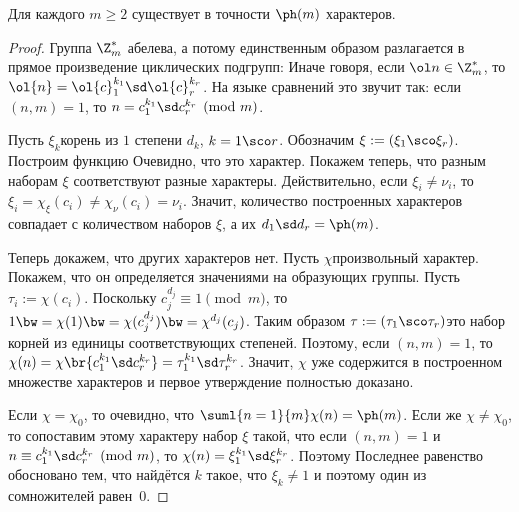 \documentclass[a4paper]{article}
\def\nequiv{\not\equiv}
\begin{document}
\begin{theorem}
Для каждого $m\ge 2$ существует в точности $\ph(m)$ характеров.
\eqn{\sums{\chi}\chi(n)=\case{\ph(m), & n\equiv1\pmod{m},\\0, & n\nequiv1\pmod{m}.}}
\end{theorem}
\begin{proof}
Группа $\Z_m^*$ абелева, а потому единственным образом разлагается в прямое произведение циклических подгрупп:
Иначе говоря, если $\ol n\in \Z_m^*$, то $\ol{n}=\ol{c}_1^{k_1}\sd\ol{c}_r^{k_r}$.
На языке сравнений это звучит так: если $(n,m)=1$, то $n=c_1^{k_1}\sd c_r^{k_r}\pmod{m}$.

Пусть $\xi_k$\т корень из $1$ степени $d_k$, $k=1\sco r$. Обозначим $\xi:=(\xi_1\sco \xi_r)$.
Построим функцию
Очевидно, что это характер.
Покажем теперь, что разным наборам $\xi$ соответствуют разные характеры. Действительно, если
$\xi_i\neq \nu_i$, то $\xi_i=\chi_\xi(c_i)\neq \chi_\nu(c_i)=\nu_i$.
Значит, количество построенных характеров совпадает с количеством наборов $\xi$, а их $d_1\sd d_r=\ph(m)$.

Теперь докажем, что других характеров нет.
Пусть $\chi$\т произвольный характер. Покажем, что он определяется значениями на образующих группы.
Пусть $\tau_i := \chi(c_i)$. Поскольку $c_j^{d_j}\equiv1\pmod{m}$, то $1\bw=\chi(1)\bw=\chi(c_j^{d_j})\bw=\chi^{d_j}(c_j)$.
Таким образом $\tau:=(\tau_1\sco \tau_r)$\т это набор корней из единицы соответствующих степеней.
Поэтому, если $(n,m)=1$, то $\chi(n)=\chi\br{c_1^{k_1}\sd c_r^{k_r}}=\tau_1^{k_1}\sd\tau_r^{k_r}$.
Значит, $\chi$ уже содержится в построенном множестве  характеров и первое утверждение полностью доказано.

 Если $\chi=\chi_0$, то очевидно, что $\suml{n=1}{m}\chi(n)=\ph(m)$. Если же $\chi\neq \chi_0$,
то сопоставим этому характеру набор $\xi$ такой, что если $(n,m)=1$ и $n\equiv c_1^{k_1}\sd c_r^{k_r}\pmod{m}$,
то $\chi(n)=\xi_1^{k_1}\sd\xi_r^{k_r}$. Поэтому
Последнее равенство обосновано тем, что найдётся $k$ такое, что $\xi_k\neq 1$ и поэтому один из сомножителей равен~$0$.


\end{proof}
\end{document}
